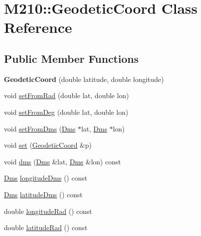\hypertarget{class_m210_1_1_geodetic_coord}{}\section{M210\+:\+:Geodetic\+Coord Class Reference}
\label{class_m210_1_1_geodetic_coord}
\subsection*{Public Member Functions}
\begin{DoxyCompactItemize}
\item 
\mbox{\label{class_m210_1_1_geodetic_coord_aa2a09cf073856b5f4411926ee1e8ddbc}} 
{\bfseries Geodetic\+Coord} (double latitude, double longitude)
\item 
void \mbox{\hyperlink{class_m210_1_1_geodetic_coord_a5786ede63ff5e1ce58f56f76c1f183c1}{set\+From\+Rad}} (double lat, double lon)
\item 
void \mbox{\hyperlink{class_m210_1_1_geodetic_coord_a701bb7be9dcf1dc15e0bb3563e4f5470}{set\+From\+Deg}} (double lat, double lon)
\item 
void \mbox{\hyperlink{class_m210_1_1_geodetic_coord_a90974b429e6d1b7392998d56e934199c}{set\+From\+Dms}} (\mbox{\hyperlink{struct_m210_1_1_dms}{Dms}} $\ast$lat, \mbox{\hyperlink{struct_m210_1_1_dms}{Dms}} $\ast$lon)
\item 
void \mbox{\hyperlink{class_m210_1_1_geodetic_coord_aaa31d62bc5a256454057f0beef807e30}{set}} (\mbox{\hyperlink{class_m210_1_1_geodetic_coord}{Geodetic\+Coord}} \&p)
\item 
void \mbox{\hyperlink{class_m210_1_1_geodetic_coord_a91f14ba9099dba8ea3b6044d74663525}{dms}} (\mbox{\hyperlink{struct_m210_1_1_dms}{Dms}} \&lat, \mbox{\hyperlink{struct_m210_1_1_dms}{Dms}} \&lon) const
\item 
\mbox{\hyperlink{struct_m210_1_1_dms}{Dms}} \mbox{\hyperlink{class_m210_1_1_geodetic_coord_aed72a7b5422dbcdfe84a3168364cc4c0}{longitude\+Dms}} () const
\item 
\mbox{\hyperlink{struct_m210_1_1_dms}{Dms}} \mbox{\hyperlink{class_m210_1_1_geodetic_coord_ac55715a3e4b46492ec8c2fe497bcd1c0}{latitude\+Dms}} () const
\item 
double \mbox{\hyperlink{class_m210_1_1_geodetic_coord_a8ba9a63a7d067d52c9745ce6d20c7ec8}{longitude\+Rad}} () const
\item 
double \mbox{\hyperlink{class_m210_1_1_geodetic_coord_aaeb0aa298f82f3c8c122be133f2cedf3}{latitude\+Rad}} () const

\end{DoxyCompactItemize}

